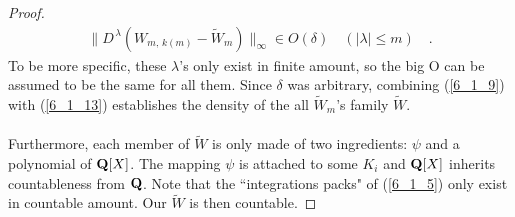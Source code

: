 \begin{proof}
\begin{align}\label{6_1_13}
 \| D^{\,\lambda} (W_{m,\, k(\!m)} - \tilde{W}_m ) \|_\infty  \in O(\delta)\quad (\lvert \lambda \rvert\leq m) \quad   . 
\end{align}
To be more specific, these $\lambda$'s only exist in finite  amount, so the big O can be assumed to be the same for all them. Since $\delta$ was arbitrary, combining  (\ref{6_1_9}) with (\ref{6_1_13}) establishes the density of the all $\tilde{W}_m$'s family $\tilde{W}$.\\
\\
Furthermore, each member of $\tilde{W}$ is only made of two ingredients: $\psi$ and a polynomial of ${\mathbf Q}[X]$. The mapping $\psi$ is attached to some $K_i$ and ${\mathbf Q}[X]$ inherits countableness from ${\mathbf Q}$. Note that the ``integrations packs" of (\ref{6_1_5}) only exist in countable amount. %
Our $\tilde{W}$ is then countable. %
\end{proof}












